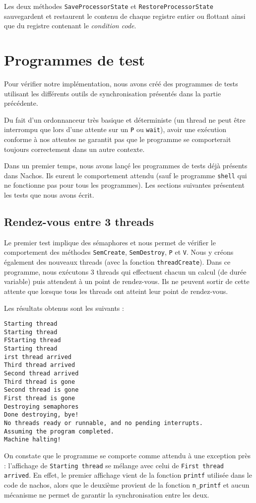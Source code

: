 \documentclass{article}
\def\fun#1{\texttt{#1}}
\begin{document}
Les deux méthodes \fun{SaveProcessorState} et \fun{RestoreProcessorState} sauvegardent et restaurent le contenu de chaque registre entier ou flottant ainsi que du registre contenant le \emph{condition code}.

\section{Programmes de test}
Pour vérifier notre implémentation, nous avons créé des programmes de tests utilisant les différents outils de synchronisation présentés dans la partie précédente.

Du fait d'un ordonnanceur très basique et déterministe (un thread ne peut être interrompu que lors d'une attente sur un \fun{P} ou \fun{wait}), avoir une exécution conforme à nos attentes ne garantit pas que le programme se comporterait toujours correctement dans un autre contexte. 

Dans un premier temps, nous avons lançé les programmes de tests déjà présents dans Nachos. Ils eurent le comportement attendu (sauf le programme \texttt{shell} qui ne fonctionne pas pour tous les programmes). Les sections suivantes présentent les tests que nous avons écrit.


\subsection{Rendez-vous entre 3 threads}
Le premier test implique des sémaphores et nous permet de vérifier le comportement des méthodes \fun{SemCreate}, \fun{SemDestroy}, \fun{P} et \fun{V}. Nous y créons également des nouveaux threads (avec la fonction \fun{threadCreate}). Dans ce programme, nous exécutons 3 threads qui effectuent chacun un calcul (de durée variable) puis attendent à un point de rendez-vous. Ils ne peuvent sortir de cette attente que lorsque  tous les threads ont atteint leur point de rendez-vous.

Les résultats obtenus sont les suivants :
\begin{lstlisting}
Starting thread
Starting thread
FStarting thread
Starting thread
irst thread arrived
Third thread arrived
Second thread arrived
Third thread is gone
Second thread is gone
First thread is gone
Destroying semaphores
Done destroying, bye!
No threads ready or runnable, and no pending interrupts.
Assuming the program completed.
Machine halting!
\end{lstlisting}

On constate que le programme se comporte comme attendu à une exception près : l'affichage de \texttt{Starting thread} se mélange avec celui de \texttt{First thread arrived}. En effet, le premier affichage vient de la fonction \fun{printf} utilisée dans le code de nachos, alors que le deuxième provient de la fonction \fun{n\_printf} et aucun mécanisme ne permet de garantir la synchronisation entre les deux.
\end{document}
